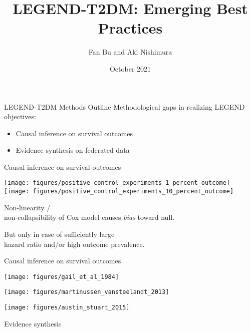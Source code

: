 \documentclass[aspectratio=169,xcolor=dvipsnames]{beamer}					%
\title{\hspace{0.2in}LEGEND-T2DM: Emerging Best Practices}	%
\author{Fan Bu and Aki Nishimura}								%
\institute{on behalf of the LEGEND initiative}					%
\date{October 2021}
\begin{document}
{
%
\begin{frame}[plain]
  \titlepage
\end{frame}
}

{
\begin{frame}{LEGEND-T2DM Methods Outline}
Methodological gaps in realizing LEGEND objectives:
\begin{itemize}
    \item Causal inference on survival outcomes
    \item Evidence synthesis on federated data
\end{itemize}
\end{frame}
}

{
\begin{frame}{Causal inference on survival outcomes}
	\hspace*{.03\linewidth}
	\begin{minipage}{.7\linewidth}
	\texttt{[image: figures/positive\_control\_experiments\_1\_percent\_outcome]}
	\texttt{[image: figures/positive\_control\_experiments\_10\_percent\_outcome]}
	\end{minipage}
	\nobreak\hspace{.15em}
	\begin{minipage}{.24\linewidth}
	Non-linearity / \\ non-collapsibility of Cox model causes \emph{bias} toward null.
	
	\pause
	\vspace*{\baselineskip}
	But only in case of sufficiently large\\ hazard ratio and/or high outcome prevalence.
	\end{minipage}
\end{frame}
}

{
\begin{frame}{Causal inference on survival outcomes}
	\begin{minipage}{\linewidth}
	\vspace*{.07\paperheight}
	\texttt{[image: figures/gail\_et\_al\_1984]}
	\end{minipage}
	\begin{minipage}{\linewidth}
	\raggedleft
	\vspace*{-.15\paperheight}
	\texttt{[image: figures/martinussen\_vansteelandt\_2013]}
	\end{minipage}
	\pause
	\begin{minipage}{\linewidth}
	\centering
	\vspace*{-.6\paperheight}
	\texttt{[image: figures/austin\_stuart\_2015]}
	\end{minipage}
\end{frame}
}

{
\begin{frame}{Evidence synthesis}


\end{frame}
}
\end{document}
